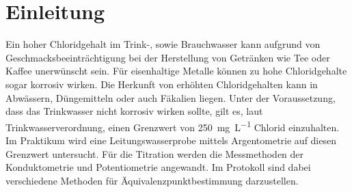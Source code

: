 %
\pagebreak
\section{Einleitung}
\label{sec:einleitung}
Ein hoher Chloridgehalt im Trink-, sowie Brauchwasser kann aufgrund von Geschmacksbeeinträchtigung bei der Herstellung von Getränken wie Tee oder Kaffee unerwünscht sein. Für eisenhaltige Metalle können zu hohe Chloridgehalte sogar korrosiv wirken. Die Herkunft von erhöhten Chloridgehalten kann in Abwässern, Düngemitteln oder auch Fäkalien liegen. Unter der Voraussetzung, dass das Trinkwasser nicht korrosiv wirken sollte, gilt es, laut Trinkwasserverordnung, einen Grenzwert von \SI{250}{\milli \gram \per \liter} Chlorid einzuhalten.\\
Im Praktikum wird eine Leitungswasserprobe mittels Argentometrie auf diesen Grenzwert untersucht. Für die Titration werden die Messmethoden der Konduktometrie und Potentiometrie angewandt. Im Protokoll sind dabei verschiedene Methoden für Äquivalenzpunktbestimmung darzustellen. 




